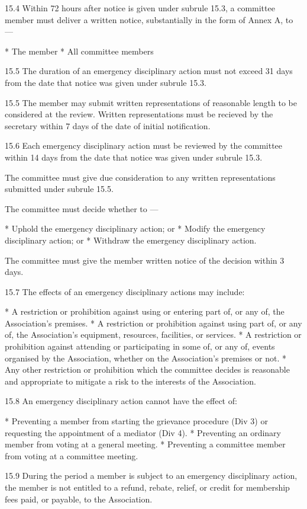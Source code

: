 \documentclass[../constitution.tex]{subfiles}
\begin{document}
15.4 Within 72 hours after notice is given under subrule 15.3, a committee member must deliver a written notice, substantially in the form of Annex A, to ---

* The member
* All committee members

15.5 The duration of an emergency disciplinary action must not exceed 31 days from the date that notice was given under subrule 15.3.

15.5 The member may submit written representations of reasonable length to be considered at the review. Written representations must be recieved by the secretary within 7 days of the date of initial notification.

15.6 Each emergency disciplinary action must be reviewed by the committee within 14 days from the date that notice was given under subrule 15.3. 

The committee must give due consideration to any written representations submitted under subrule 15.5.

The committee must decide whether to ---

* Uphold the emergency disciplinary action; or
* Modify the emergency disciplinary action; or
* Withdraw the emergency disciplinary action.

The committee must give the member written notice of the decision within 3 days.

15.7 The effects of an emergency disciplinary actions may include:

* A restriction or prohibition against using or entering part of, or any of, the Association's premises.
* A restriction or prohibition against using part of, or any of, the Association's equipment, resources, facilities, or services.
* A restriction or prohibition against attending or participating in some of, or any of, events organised by the Association, whether on the Association's premises or not.
* Any other restriction or prohibition which the committee decides is reasonable and appropriate to mitigate a risk to the interests of the Association.

15.8 An emergency disciplinary action cannot have the effect of:

* Preventing a member from starting the grievance procedure (Div 3) or requesting the appointment of a mediator (Div 4).
* Preventing an ordinary member from voting at a general meeting.
* Preventing a committee member from voting at a committee meeting.

15.9 During the period a member is subject to an emergency disciplinary action, the member is not entitled to a refund, rebate, relief, or credit for membership fees paid, or payable, to the Association.
\end{document}
